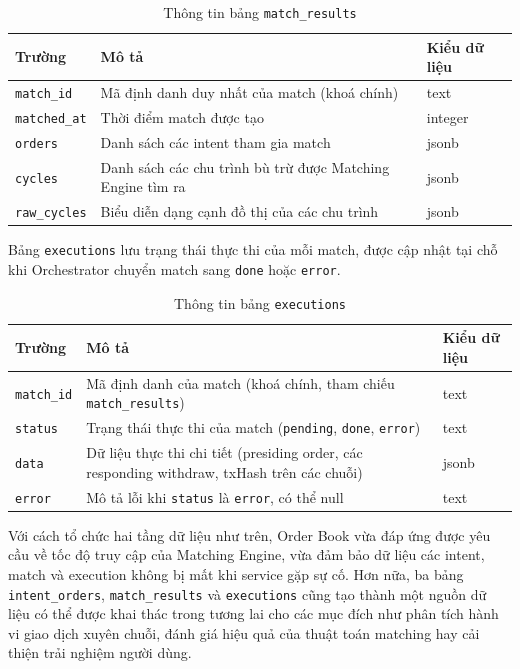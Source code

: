 \begin{table}[H]
    \centering
    \caption{Thông tin bảng \texttt{match\_results}}
    \label{tab:match-results}
    \begin{tabular}{|l|p{8cm}|l|}
        \hline
        \textbf{Trường} & \textbf{Mô tả} & \textbf{Kiểu dữ liệu} \\
        \hline
        \texttt{match\_id} & Mã định danh duy nhất của match (khoá chính) & text \\
        \hline
        \texttt{matched\_at} & Thời điểm match được tạo & integer \\
        \hline
        \texttt{orders} & Danh sách các intent tham gia match & jsonb \\
        \hline
        \texttt{cycles} & Danh sách các chu trình bù trừ được Matching Engine tìm ra & jsonb \\
        \hline
        \texttt{raw\_cycles} & Biểu diễn dạng cạnh đồ thị của các chu trình & jsonb \\
        \hline
    \end{tabular}
\end{table}

Bảng \texttt{executions} lưu trạng thái thực thi của mỗi match, được cập nhật
tại chỗ khi Orchestrator chuyển match sang \texttt{done} hoặc \texttt{error}.

\begin{table}[H]
    \centering
    \caption{Thông tin bảng \texttt{executions}}
    \label{tab:executions}
    \begin{tabular}{|l|p{8cm}|l|}
        \hline
        \textbf{Trường} & \textbf{Mô tả} & \textbf{Kiểu dữ liệu} \\
        \hline
        \texttt{match\_id} & Mã định danh của match (khoá chính, tham chiếu \texttt{match\_results}) & text \\
        \hline
        \texttt{status} & Trạng thái thực thi của match (\texttt{pending}, \texttt{done}, \texttt{error}) & text \\
        \hline
        \texttt{data} & Dữ liệu thực thi chi tiết (presiding order, các responding withdraw, txHash trên các chuỗi) & jsonb \\
        \hline
        \texttt{error} & Mô tả lỗi khi \texttt{status} là \texttt{error}, có thể null & text \\
        \hline
    \end{tabular}
\end{table}


Với cách tổ chức hai tầng dữ liệu như trên, Order Book vừa đáp ứng được yêu cầu về
tốc độ truy cập của Matching Engine, vừa đảm bảo dữ liệu các intent, match và execution
không bị mất khi service gặp sự cố. Hơn nữa, ba bảng \texttt{intent\_orders},
\texttt{match\_results} và \texttt{executions} cũng tạo thành một nguồn dữ liệu có thể được
khai thác trong tương lai cho các mục đích như phân tích hành vi
giao dịch xuyên chuỗi, đánh giá hiệu quả của thuật toán matching hay cải thiện trải
nghiệm người dùng.
